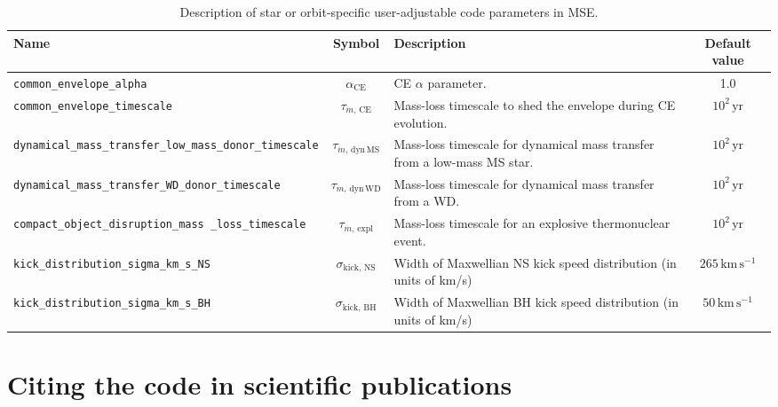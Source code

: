 \documentclass[a4paper,11pt]{article}
\newcommand{\CE}{\mathrm{CE}}
\newcommand{\kick}{\mathrm{kick}}
\newcommand{\BH}{\mathrm{BH}}
\newcommand{\NS}{\mathrm{NS}}
\newcommand{\taumt}{\tau_\mathrm{MT}}
\newcommand{\mse}{\textsc{MSE}}
\renewcommand{\S}{Section}
\newcommand{\kms}{\mathrm{km\,s^{-1}}}
\newcommand{\yr}{\mathrm{yr}}
\begin{document}
\begin{table}
\begin{tabular}{p{6.0cm}cp{4.0cm}c}
\toprule
Name & Symbol & Description & Default value \\
\midrule
\texttt{common\_envelope\_alpha} & $\alpha_{\CE}$ & CE $\alpha$ parameter. & 1.0 \\
\texttt{common\_envelope\_timescale} & $\tau_{\dot{m},\,\mathrm{CE}}$ 	& Mass-loss timescale to shed the envelope during CE evolution. & $10^2\,\yr$ \\
\texttt{dynamical\_mass\_transfer\_low\_mass\newline \_donor\_timescale} & $\tau_{\dot{m},\,\mathrm{dyn\,MS}}$ 	& Mass-loss timescale for dynamical mass transfer from a low-mass MS star. & $10^2\,\yr$ \\
\texttt{dynamical\_mass\_transfer\_WD\_donor\newline \_timescale} & $\tau_{\dot{m},\,\mathrm{dyn\,WD}}$ 	& Mass-loss timescale for dynamical mass transfer from a WD. & $10^2\,\yr$ \\
\texttt{compact\_object\_disruption\_mass \newline \_loss\_timescale} & $\tau_{\dot{m},\,\mathrm{expl}}$ 	& Mass-loss timescale for an explosive thermonuclear event. & $10^2\,\yr$ \\
\texttt{kick\_distribution\_sigma\_km\_s\_NS} & $\sigma_{\kick,\,\NS}$ & Width of Maxwellian NS kick speed distribution (in units of km/s) & $265\,\kms$ \\
\texttt{kick\_distribution\_sigma\_km\_s\_BH} & $\sigma_{\kick,\,\BH}$ & Width of Maxwellian BH kick speed distribution (in units of km/s) & $50\,\kms$ \\
\bottomrule
\end{tabular}
\caption{Description of star or orbit-specific user-adjustable code parameters in \mse. }
\label{table:par_spec}
\end{table}

\section{Citing the code in scientific publications}
\end{document}
